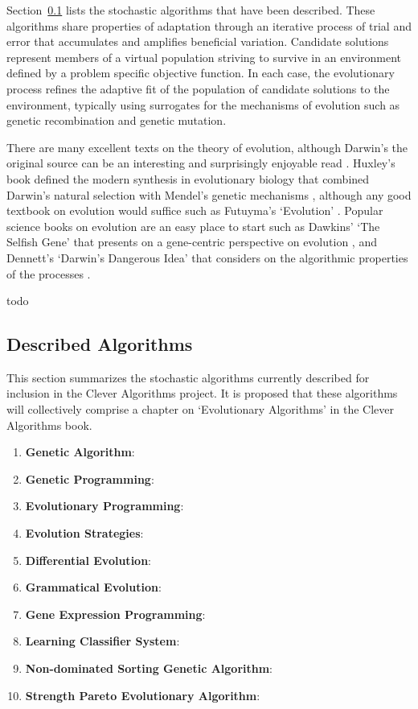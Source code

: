 \documentclass[a4paper, 11pt]{article}
\begin{document}
Section~\ref{subsec:algorithms} lists the stochastic algorithms that have been described. These algorithms share properties of adaptation through an iterative process of trial and error that accumulates and amplifies beneficial variation. Candidate solutions represent members of a virtual population striving to survive in an environment defined by a problem specific objective function. In each case, the evolutionary process refines the adaptive fit of the population of candidate solutions to the environment, typically using surrogates for the mechanisms of evolution such as genetic recombination and genetic mutation.

There are many excellent texts on the theory of evolution, although Darwin's the original source can be an interesting and surprisingly enjoyable read \cite{Darwin1859}. Huxley's book defined the modern synthesis in evolutionary biology that combined Darwin's natural selection with Mendel's genetic mechanisms \cite{Huxley1942}, although any good textbook on evolution would suffice such as Futuyma's `Evolution' \cite{Futuyma2009}. Popular science books on evolution are an easy place to start such as Dawkins' `The Selfish Gene' that presents on a gene-centric perspective on evolution \cite{Dawkins1976}, and Dennett's `Darwin's Dangerous Idea' that considers on the algorithmic properties of the processes \cite{Dennett1995}.

todo


% 
% 
\subsection{Described Algorithms}
\label{subsec:algorithms}
This section summarizes the stochastic algorithms currently described for inclusion in the Clever Algorithms project. It is proposed that these algorithms will collectively comprise a chapter on `Evolutionary Algorithms' in the Clever Algorithms book. 

\begin{enumerate}
	\item \textbf{Genetic Algorithm}: \cite{Brownlee2010p}
	\item \textbf{Genetic Programming}: \cite{Brownlee2010q}
	\item \textbf{Evolutionary Programming}: \cite{Brownlee2010r}
	\item \textbf{Evolution Strategies}: \cite{Brownlee2010s}
	\item \textbf{Differential Evolution}: \cite{Brownlee2010t}
	\item \textbf{Grammatical Evolution}: \cite{Brownlee2010u}
	\item \textbf{Gene Expression Programming}: \cite{Brownlee2010v}
	\item \textbf{Learning Classifier System}: \cite{Brownlee2010w}
	\item \textbf{Non-dominated Sorting Genetic Algorithm}: \cite{Brownlee2010x}
	\item \textbf{Strength Pareto Evolutionary Algorithm}: \cite{Brownlee2010y}
\end{enumerate}
\end{document}
